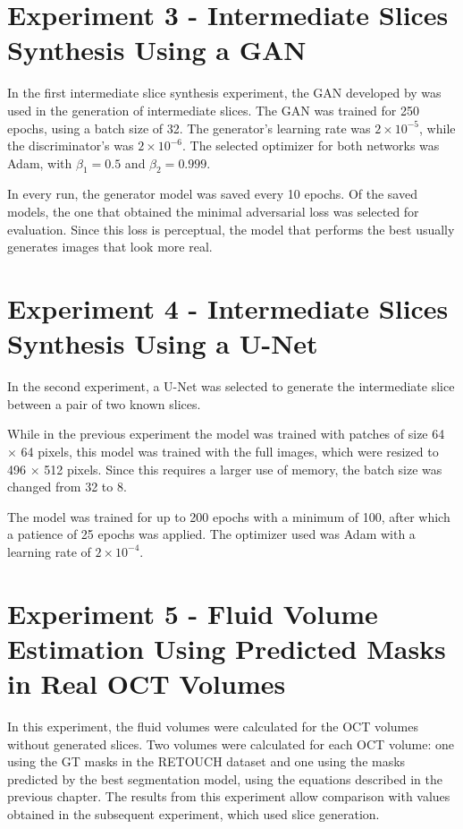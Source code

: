 \section{Experiment 3 - Intermediate Slices Synthesis Using a GAN}
In the first intermediate slice synthesis experiment, the GAN developed by \textcite{Tran2020} was used in the generation of intermediate slices. The GAN was trained for 250 epochs, using a batch size of 32. The generator's learning rate was $2 \times 10^{-5}$, while the discriminator's was $2 \times 10^{-6}$. The selected optimizer for both networks was Adam, with $\beta_{1}=0.5$ and $\beta_{2}=0.999$.
\par
In every run, the generator model was saved every 10 epochs. Of the saved models, the one that obtained the minimal adversarial loss was selected for evaluation. Since this loss is perceptual, the model that performs the best usually generates images that look more real.

\section{Experiment 4 - Intermediate Slices Synthesis Using a U-Net}
In the second experiment, a U-Net was selected to generate the intermediate slice between a pair of two known slices. 
\par
While in the previous experiment the model was trained with patches of size 64 $\times$ 64 pixels, this model was trained with the full images, which were resized to 496 $\times$ 512 pixels. Since this requires a larger use of memory, the batch size was changed from 32 to 8.
\par
The model was trained for up to 200 epochs with a minimum of 100, after which a patience of 25 epochs was applied. The optimizer used was Adam with a learning rate of $2 \times 10^{-4}$.

\section{Experiment 5 - Fluid Volume Estimation Using Predicted Masks in Real OCT Volumes}

In this experiment, the fluid volumes were calculated for the OCT volumes without generated slices. Two volumes were calculated for each OCT volume: one using the GT masks in the RETOUCH dataset and one using the masks predicted by the best segmentation model, using the equations described in the previous chapter. The results from this experiment allow comparison with values obtained in the subsequent experiment, which used slice generation.


